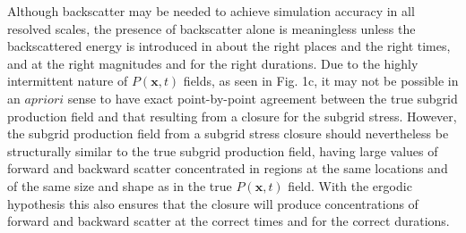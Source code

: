 Although backscatter may be needed to achieve simulation accuracy in all resolved scales, the presence of backscatter alone is meaningless unless the backscattered energy is introduced in about the right places and the right times, and at the right magnitudes and for the right durations. Due to the highly intermittent nature of  $P(\mathbf{x},t)$  fields, as seen in Fig. 1c, it may not be possible in an $a priori$ sense to have exact point-by-point agreement between the true subgrid production field and that resulting from a closure for the subgrid stress. However, the subgrid production field from a subgrid stress closure should nevertheless be structurally similar to the true subgrid production field, having large values of forward and backward scatter concentrated in regions at the same locations and of the same size and shape as in the true  $P(\mathbf{x},t)$  field. With the ergodic hypothesis this also ensures that the closure will produce concentrations of forward and backward scatter at the correct times and for the correct durations.

